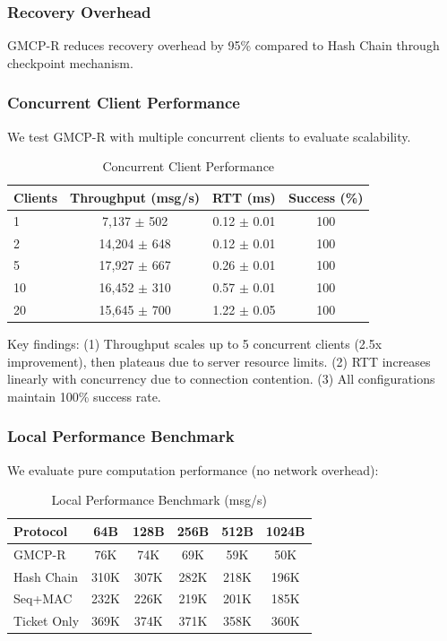 \documentclass[conference]{IEEEtran}
\begin{document}
\subsubsection{Recovery Overhead}

GMCP-R reduces recovery overhead by 95\% compared to Hash Chain through checkpoint mechanism.

\subsubsection{Concurrent Client Performance}

We test GMCP-R with multiple concurrent clients to evaluate scalability.

\begin{table}[t]
\centering
\caption{Concurrent Client Performance}
\begin{tabular}{lccc}
\toprule
Clients & Throughput (msg/s) & RTT (ms) & Success (\%) \\
\midrule
1 & 7,137 $\pm$ 502 & 0.12 $\pm$ 0.01 & 100 \\
2 & 14,204 $\pm$ 648 & 0.12 $\pm$ 0.01 & 100 \\
5 & 17,927 $\pm$ 667 & 0.26 $\pm$ 0.01 & 100 \\
10 & 16,452 $\pm$ 310 & 0.57 $\pm$ 0.01 & 100 \\
20 & 15,645 $\pm$ 700 & 1.22 $\pm$ 0.05 & 100 \\
\bottomrule
\end{tabular}
\label{tab:concurrent}
\end{table}

Key findings: (1) Throughput scales up to 5 concurrent clients (2.5x improvement), then plateaus due to server resource limits. (2) RTT increases linearly with concurrency due to connection contention. (3) All configurations maintain 100\% success rate.

\subsubsection{Local Performance Benchmark}

We evaluate pure computation performance (no network overhead):

\begin{table}[t]
\centering
\caption{Local Performance Benchmark (msg/s)}
\begin{tabular}{lccccc}
\toprule
Protocol & 64B & 128B & 256B & 512B & 1024B \\
\midrule
GMCP-R & 76K & 74K & 69K & 59K & 50K \\
Hash Chain & 310K & 307K & 282K & 218K & 196K \\
Seq+MAC & 232K & 226K & 219K & 201K & 185K \\
Ticket Only & 369K & 374K & 371K & 358K & 360K \\
\bottomrule
\end{tabular}
\label{tab:local_benchmark}
\end{table}
\end{document}
